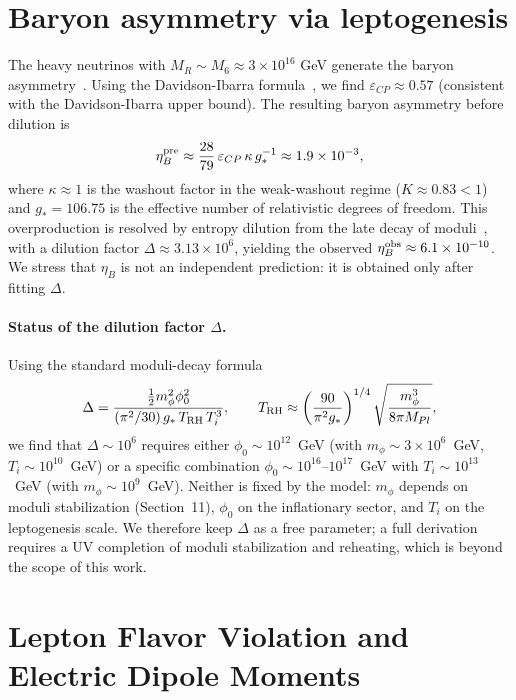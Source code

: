 \documentclass[12pt,a4paper]{article}
\numberwithin{equation}{section}
\begin{document}
\section{Baryon asymmetry via leptogenesis}
The heavy neutrinos with \(M_R \sim M_6 \approx 3 \times 10^{16}\) GeV generate the baryon asymmetry~\cite{Fukugita1986}. Using the Davidson-Ibarra formula~\cite{DavidsonIbarra2002}, we find \(\varepsilon_{CP} \approx 0.57\) (consistent with the Davidson-Ibarra upper bound). The resulting baryon asymmetry before dilution is
\begin{equation}
\eta_B^{\rm pre} \approx \frac{28}{79}\,\varepsilon_{CP}\,\kappa\,g_*^{-1} \approx 1.9\times10^{-3},
\end{equation}
where \(\kappa \approx 1\) is the washout factor in the weak-washout regime (\(K \approx 0.83 < 1\)) and \(g_* = 106.75\) is the effective number of relativistic degrees of freedom. This overproduction is resolved by entropy dilution from the late decay of moduli~\cite{KKLT2003}, with a dilution factor \(\Delta \approx 3.13 \times 10^6\), yielding the observed \(\eta_B^{\rm obs} \approx 6.1 \times 10^{-10}\). We stress that \(\eta_B\) is not an independent prediction: it is obtained only after fitting \(\Delta\).

\paragraph{Status of the dilution factor \(\Delta\).}
Using the standard moduli-decay formula
\begin{equation}
\Delta = \frac{\tfrac12 m_\phi^2 \phi_0^2}
{(\pi^2/30)\,g_*\,T_{\rm RH}\,T_i^3},
\qquad
T_{\rm RH} \approx \left(\frac{90}{\pi^2 g_*}\right)^{1/4}
\sqrt{\frac{m_\phi^3}{8\pi M_{Pl}}},
\end{equation}
we find that \(\Delta \sim 10^6\) requires either \(\phi_0 \sim 10^{12}\)~GeV (with \(m_\phi \sim 3\times 10^6\)~GeV, \(T_i \sim 10^{10}\)~GeV) or a specific combination \(\phi_0 \sim 10^{16}\)--\(10^{17}\)~GeV with \(T_i \sim 10^{13}\)~GeV (with \(m_\phi \sim 10^9\)~GeV). Neither is fixed by the model: \(m_\phi\) depends on moduli stabilization (Section~11), \(\phi_0\) on the inflationary sector, and \(T_i\) on the leptogenesis scale. We therefore keep \(\Delta\) as a free parameter; a full derivation requires a UV completion of moduli stabilization and reheating, which is beyond the scope of this work.

\section{Lepton Flavor Violation and Electric Dipole Moments}
\label{sec:lfv_edm}
\end{document}
